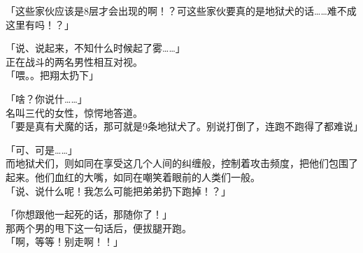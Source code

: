 「这些家伙应该是8层才会出现的啊！？可这些家伙要真的是地狱犬的话……难不成这里有吗！？」

「说、说起来，不知什么时候起了雾……」\\

正在战斗的两名男性相互对视。\\

「喂。。把翔太扔下」

「啥？你说什……」\\

名叫三代的女性，惊愕地答道。\\

「要是真有犬魔的话，那可就是9条地狱犬了。别说打倒了，连跑不跑得了都难说」

「可、可是……」\\

而地狱犬们，则如同在享受这几个人间的纠缠般，控制着攻击频度，把他们包围了起来。他们血红的大嘴，如同在嘲笑着眼前的人类们一般。\\

「说、说什么呢！我怎么可能把弟弟扔下跑掉！？」

「你想跟他一起死的话，那随你了！」\\

那两个男的甩下这一句话后，便拔腿开跑。\\

「啊，等等！别走啊！！」\\


